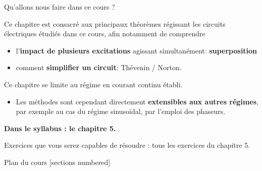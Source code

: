 \titleframe






\begin{frame}{Qu'allons nous faire dans ce cours ?}
	
	Ce chapitre est consacré aux principaux théorèmes régissant les circuits électriques étudiés dans ce cours, afin notamment de comprendre 
	
	\begin{itemize}
		\item l'\textbf{impact de plusieurs excitations} agissant simultanément: \textbf{superposition}
		\item comment \textbf{simplifier un circuit}: Thévenin / Norton.
	\end{itemize}
	
	\vfill 
	
	Ce chapitre se limite au régime en courant continu établi. 
 	\begin{itemize}	
 		\item Les méthodes sont cependant directement \textbf{extensibles aux autres régimes}, par exemple au cas du régime sinusoïdal, par l'emploi des phaseurs.
	\end{itemize}
	
	\vfill 
	\textbf{Dans le syllabus : le chapitre 5.}

	Exercices que vous serez capables de résoudre : tous les exercices du chapitre 5.

	
\end{frame}

\begin{frame}{Plan du cours}
  [sections numbered]
  \tableofcontents[hideallsubsections]
\end{frame}





